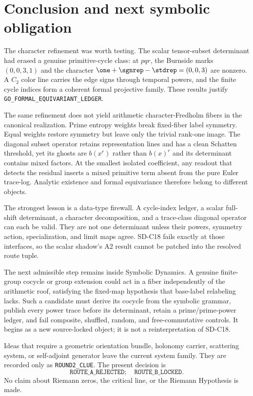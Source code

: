 \section{Conclusion and next symbolic obligation}
\label{sec:conclusion}

The character refinement was worth testing.  The scalar tensor-subset
determinant had erased a genuine primitive-cycle class: at $pqr$, the
Burnside marks $(0,0,3,1)$ and the character
$\one+\sgnrep-\stdrep=(0,0,3)$ are nonzero.  A $C_2$ color line carries the
edge signs through temporal powers, and the finite cycle indices form a
coherent formal projective family.  These results justify
\texttt{GO\_FORMAL\_EQUIVARIANT\_LEDGER}.

The same refinement does not yield arithmetic character-Fredholm fibers in
the canonical realization.  Prime entropy weights break fixed-fiber label
symmetry.  Equal weights restore symmetry but leave only the trivial rank-one
image.  The diagonal subset operator retains representation lines and has a
clean Schatten threshold, yet its ghosts are $b(x^r)$ rather than $b(x)^r$
and its determinant contains mixed factors.  At the smallest isolated
coefficient, any readout that detects the residual inserts a mixed primitive
term absent from the pure Euler trace-log.  Analytic existence and formal
equivariance therefore belong to different objects.

The strongest lesson is a data-type firewall.  A cycle-index ledger, a
scalar full-shift determinant, a character decomposition, and a trace-class
diagonal operator can each be valid.  They are not one determinant unless
their powers, symmetry action, specialization, and limit maps agree.  SD-C18
fails exactly at those interfaces, so the scalar shadow's A2 result cannot be
patched into the resolved route tuple.

The next admissible step remains inside Symbolic Dynamics.  A genuine
finite-group cocycle or group extension could act in a fiber independently
of the arithmetic roof, satisfying the fixed-map hypothesis that base-label
relabeling lacks.  Such a candidate must derive its cocycle from the symbolic
grammar, publish every power trace before its determinant, retain a
prime/prime-power ledger, and fail composite, shuffled, random, and
free-commutative controls.  It begins as a new source-locked object; it is not
a reinterpretation of SD-C18.

Ideas that require a geometric orientation bundle, holonomy carrier,
scattering system, or self-adjoint generator leave the current system family.
They are recorded only as \texttt{ROUND2\_CLUE}.  The present decision is
\[
 \boxed{\texttt{ROUTE\_A\_REJECTED};\quad
        \texttt{ROUTE\_B\_LOCKED}.}
\]
No claim about Riemann zeros, the critical line, or the Riemann Hypothesis is
made.
